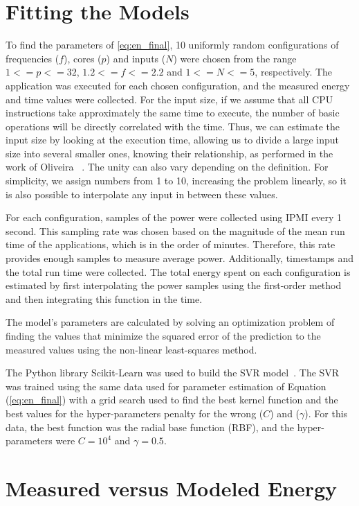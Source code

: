\section{Fitting the Models} \label{subsec:fitting}
To find the parameters of  \cref{eq:en_final}, 10 uniformly random configurations of frequencies ($f$), cores ($p$) and inputs ($N$) were chosen from the range $1<=p<=32$, $1.2<=f<=2.2$ and $1<=N<=5$, respectively. The application was executed for each chosen configuration, and the measured energy and time values were collected. For the input size, if we assume that all CPU instructions take approximately the same time to execute, the number of basic operations will be directly correlated with the time. Thus, we can estimate the input size by looking at the execution time, allowing us to divide a large input size into several smaller ones, knowing their relationship, as performed in the work of Oliveira ~\cite{Oliveira2018ApplicationCharacterization}. The unity can also vary depending on the definition. For simplicity, we assign numbers from 1 to 10, increasing the problem linearly, so it is also possible to interpolate any input in between these values.

For each configuration, samples of the power were collected using IPMI every 1 second. This sampling rate was chosen based on the magnitude of the mean run time of the applications, which is in the order of minutes. Therefore, this rate provides enough samples to measure average power. Additionally, timestamps and the total run time were collected. The total energy spent on each configuration is estimated by first interpolating the power samples using the first-order method and then integrating this function in the time.

The model's parameters are calculated by solving an optimization problem of finding the values that minimize the squared error of the prediction to the measured values using the non-linear least-squares method.

The Python library Scikit-Learn was used to build the SVR model~\cite{Pedregosa2011Scikit-learn:Python}. The SVR was trained using the same data used for parameter estimation of Equation (\ref{eq:en_final}) %
with a grid search used to find the best kernel function and the best values for the hyper-parameters penalty for the wrong ($C$) and ($\gamma$). For this data, the best function was the radial base function (RBF), and the hyper-parameters were $C=10^4$ and $\gamma=0.5$.


\section{Measured versus Modeled Energy}
\label{subsec:measuredversusmodeledenergy}

